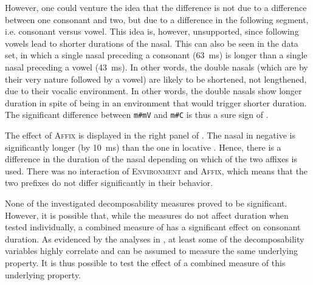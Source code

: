 However, one could venture the idea that the difference is not due to a difference between one consonant and two, but due to a difference in the following segment, i.e. consonant versus vowel. This idea is, however, unsupported, since following vowels lead to shorter durations of the nasal. This can also be seen in the data set, in which a single nasal preceding a consonant (63~ms) is longer than a single nasal preceding a vowel (43~ms). In other words, the double nasals (which are by their very nature followed by a vowel) are likely to be shortened, not lengthened, due to their vocalic environment. In other words, the double nasals show longer duration in spite of being in an environment that would trigger shorter duration. The significant difference between \texttt{m\#mV}  and \texttt{m\#C} is thus a sure sign of .



The effect of \textsc{Affix} is displayed  in the right panel of . The nasal in negative  is significantly longer (by 10~ms) than the one in locative . Hence, there is a difference in the duration of the nasal depending on which of the two affixes is used. There was no interaction of \textsc{Environment} and \textsc{Affix}, which means that the two prefixes do not differ significantly in their  behavior.


None of the investigated decomposability measures proved to be significant. However, it is possible that, while the measures do not affect duration when tested individually, a combined measure of  has a significant effect on consonant duration. As evidenced by the  analyses in , at least some of the decomposability variables highly correlate and can be assumed to measure the same underlying property. It is thus possible to test the effect of a combined measure of this underlying property. 

